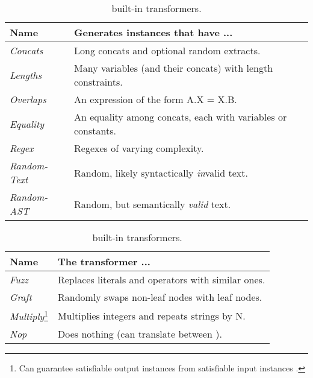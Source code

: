 \begin{table}[t]
    \caption{\fuzzer{} built-in (a) generators and (b) transformers.}
    \begin{subtable}{1\textwidth}
        \centering
        \caption{\generator{} built-in generators.}
        \label{tbl:generators}
        \begin{tabular}{ l l }
            \toprule
            \textbf{Name}
            & \textbf{Generates instances that have ...} \\
            \midrule
            \textit{Concats}
            & Long concats and optional random extracts. \\
            \textit{Lengths}
            & Many variables (and their concats) with length constraints. \\
            \textit{Overlaps}
            & An expression of the form A.X = X.B. \\
            \textit{Equality}
            & An equality among concats, each with variables or constants. \\
            \textit{Regex}
            & Regexes of varying complexity. \\
            \textit{Random-Text}
            & Random, likely syntactically \textit{in}valid text. \\
            \textit{Random-AST}
            & Random, but semantically \textit{valid} text. \\
            \bottomrule
        \end{tabular}
    \end{subtable}
    \begin{subtable}{1\textwidth}
        \centering
        \caption{\transformer{} built-in transformers.}
        \label{tbl:transformers}
        \begin{tabular}{l l}
            \toprule
            \textbf{Name}
            & \textbf{The transformer ...} \\
            \midrule
            \textit{Fuzz}
            & Replaces literals and operators with similar ones.\\
            \textit{Graft}
            & Randomly swaps non-leaf nodes with leaf nodes.\\
            \textit{Multiply}\footnote{Can guarantee satisfiable output
            instances from satisfiable input instances \cite{website}.}
            & Multiplies integers and repeats strings by N.\\
            \textit{Nop}
            & Does nothing (can translate between \smtfull{}).\\

\end{tabular}
\end{subtable}
\end{table}
